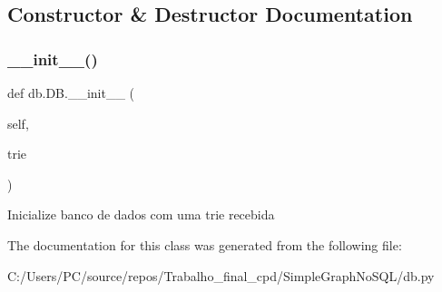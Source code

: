 \subsection{Constructor \& Destructor Documentation}
\mbox{\label{classdb_1_1_d_b_af1e6dda03c0f1c1a5bf4b993865a5b3a}} 
\subsubsection{\texorpdfstring{\+\_\+\+\_\+init\+\_\+\+\_\+()}{\_\_init\_\_()}}
{\footnotesize\ttfamily def db.\+D\+B.\+\_\+\+\_\+init\+\_\+\+\_\+ (\begin{DoxyParamCaption}\item[{}]{self,  }\item[{}]{trie }\end{DoxyParamCaption})}

\begin{DoxyVerb}Inicialize banco de dados com uma trie recebida\end{DoxyVerb}
 

The documentation for this class was generated from the following file\+:\begin{DoxyCompactItemize}
\item 
C\+:/\+Users/\+P\+C/source/repos/\+Trabalho\+\_\+final\+\_\+cpd/\+Simple\+Graph\+No\+S\+Q\+L/db.\+py\end{DoxyCompactItemize}
